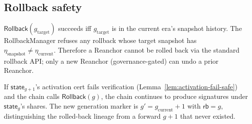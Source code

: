 
\subsection*{Rollback safety}

\begin{theorem}
\label{thm:rollback-era-boundary}
$\mathsf{Rollback}(g_{\text{target}})$ succeeds iff
$g_{\text{target}}$ is in the current era's snapshot history. The
RollbackManager refuses any rollback whose target snapshot has
$\eta_{\text{snapshot}} \neq \eta_{\text{current}}$. Therefore a
Reanchor cannot be rolled back via the standard rollback API; only a
new Reanchor (governance-gated) can undo a prior Reanchor.
\end{theorem}

\begin{theorem}
\label{thm:rollback-liveness}
If $\mathsf{state}_{g+1}$'s activation cert fails verification
(Lemma~\ref{lem:activation-fail-safe}) and the chain calls
$\mathsf{Rollback}(g)$, the chain continues to produce signatures
under $\mathsf{state}_g$'s shares. The new generation marker is
$g' = g_{\text{current}}+1$ with $\mathsf{rb} = g$, distinguishing
the rolled-back lineage from a forward $g+1$ that never existed.
\end{theorem}
